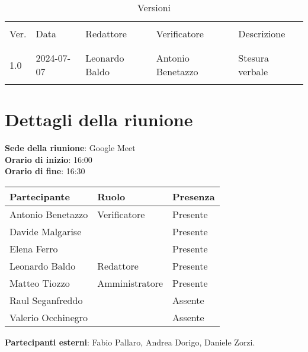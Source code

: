 \documentclass[italian,12pt]{article}
\begin{document}


\newpage



\begin{table}[!h]
	\caption{Versioni}
	\footnotesize
	\begin{center}
		\begin{tabular}{ l l l l p{6cm} }
			\hline                                                                     \\[-2ex]
			Ver. & Data       & Redattore        & Verificatore      & Descrizione     \\
			\\[-2ex] \hline \\[-1.5ex]
			1.0  & 2024-07-07 & Leonardo Baldo   & Antonio Benetazzo & Stesura verbale \\
			\\[-1.5ex] \hline
		\end{tabular}
	\end{center}
\end{table}

\newpage

\tableofcontents

\newpage

\section{Dettagli della riunione}

\textbf{Sede della riunione}: Google Meet\\
\textbf{Orario di inizio}: 16:00\\
\textbf{Orario di fine}: 16:30\\

\begin{flushleft}
	\begin{table}[!h]
		\begin{tabular}{ |l|l|l| }
			\hline
			\textbf{Partecipante} & \textbf{Ruolo} & \textbf{Presenza} \\
			\hline
			Antonio Benetazzo     & Verificatore   & Presente          \\
			Davide Malgarise      &                & Presente          \\
			Elena Ferro           &                & Presente          \\
			Leonardo Baldo        & Redattore      & Presente          \\
			Matteo Tiozzo         & Amministratore & Presente          \\
			Raul Seganfreddo      &                & Assente           \\
			Valerio Occhinegro    &                & Assente           \\
			\hline
		\end{tabular}
	\end{table}
	\textbf{Partecipanti esterni}: Fabio Pallaro, Andrea Dorigo, Daniele Zorzi.\\
\end{flushleft}
\end{document}
